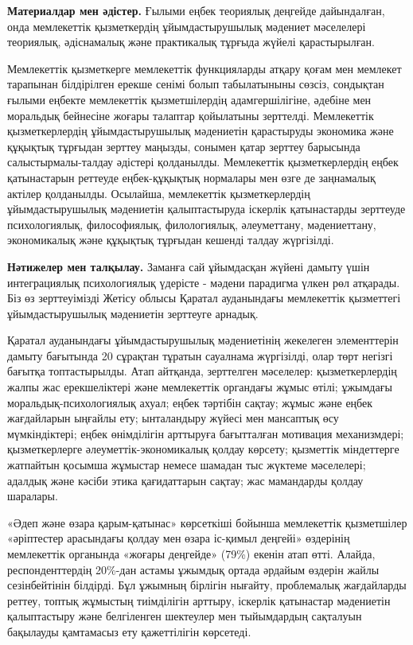 \begin{multicols}{2}
{\bfseries Материалдар мен әдістер.} Ғылыми еңбек теориялық деңгейде
дайындалған, онда мемлекеттік қызметкердің ұйымдастырушылық мәдениет
мәселелері теориялық, әдіснамалық және практикалық тұрғыда жүйелі
қарастырылған.

Мемлекеттік қызметкерге мемлекеттік функцияларды атқару қоғам мен
мемлекет тарапынан білдірілген ерекше сенімі болып табылатыныны сөзсіз,
сондықтан ғылыми еңбекте мемлекеттік қызметшілердің адамгершілігіне,
әдебіне мен моральдық бейнесіне жоғары талаптар қойылатыны зерттелді.
Мемлекеттік қызметкерлердің ұйымдастырушылық мәдениетін қарастыруды
экономика және құқықтық тұрғыдан зерттеу маңызды, сонымен қатар зерттеу
барысында салыстырмалы-талдау әдістері қолданылды. Мемлекеттік
қызметкерлердің еңбек қатынастарын реттеуде еңбек-құқықтық нормалары мен
өзге де заңнамалық актілер қолданылды. Осылайша, мемлекеттік
қызметкерлердің ұйымдастырушылық мәдениетін қалыптастыруда іскерлік
қатынастарды зерттеуде психологиялық, философиялық, филологиялық,
әлеуметтану, мәдениеттану, экономикалық және құқықтық тұрғыдан кешенді
талдау жүргізілді.

{\bfseries Нәтижелер мен талқылау.} Заманға сай ұйымдасқан жүйені дамыту
үшін интеграциялық психологиялық үдерісте - мәдени парадигма үлкен рөл
атқарады. Біз өз зерттеуімізді Жетісу облысы Қаратал ауданындағы
мемлекеттік қызметтегі ұйымдастырушылық мәдениетін зерттеуге арнадық.

Қаратал ауданындағы ұйымдастырушылық мәдениетінің жекелеген элементтерін
дамыту бағытында 20 сұрақтан тұратын сауалнама жүргізілді, олар төрт
негізгі бағытқа топтастырылды. Атап айтқанда, зерттелген мәселелер:
қызметкерлердің жалпы жас ерекшеліктері және мемлекеттік органдағы жұмыс
өтілі; ұжымдағы моральдық-психологиялық ахуал; еңбек тәртібін сақтау;
жұмыс және еңбек жағдайларын ыңғайлы ету; ынталандыру жүйесі мен
мансаптық өсу мүмкіндіктері; еңбек өнімділігін арттыруға бағытталған
мотивация механизмдері; қызметкерлерге әлеуметтік-экономикалық қолдау
көрсету; қызметтік міндеттерге жатпайтын қосымша жұмыстар немесе шамадан
тыс жүктеме мәселелері; адалдық және кәсіби этика қағидаттарын сақтау;
жас мамандарды қолдау шаралары.

«Әдеп және өзара қарым-қатынас» көрсеткіші бойынша мемлекеттік
қызметшілер «әріптестер арасындағы қолдау мен өзара іс-қимыл деңгейі»
өздерінің мемлекеттік органында «жоғары деңгейде» (79\%) екенін атап
өтті. Алайда, респонденттердің 20\%-дан астамы ұжымдық ортада әрдайым
өздерін жайлы сезінбейтінін білдірді. Бұл ұжымның бірлігін нығайту,
проблемалық жағдайларды реттеу, топтық жұмыстың тиімділігін арттыру,
іскерлік қатынастар мәдениетін қалыптастыру және белгіленген шектеулер
мен тыйымдардың сақталуын бақылауды қамтамасыз ету қажеттілігін
көрсетеді.


\end{multicols}

